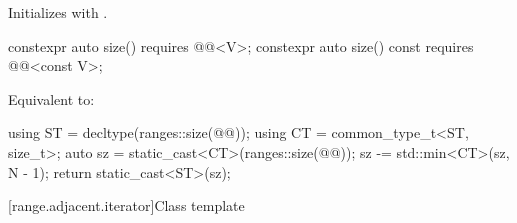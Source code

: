 \begin{itemdescr}
\pnum
\effects
Initializes  with .
\end{itemdescr}

\begin{itemdecl}
constexpr auto size() requires @@<V>;
constexpr auto size() const requires @@<const V>;
\end{itemdecl}

\begin{itemdescr}
\pnum
\effects
Equivalent to:
\begin{codeblock}
using ST = decltype(ranges::size(@@));
using CT = common_type_t<ST, size_t>;
auto sz = static_cast<CT>(ranges::size(@@));
sz -= std::min<CT>(sz, N - 1);
return static_cast<ST>(sz);
\end{codeblock}
\end{itemdescr}

[range.adjacent.iterator]{Class template }

